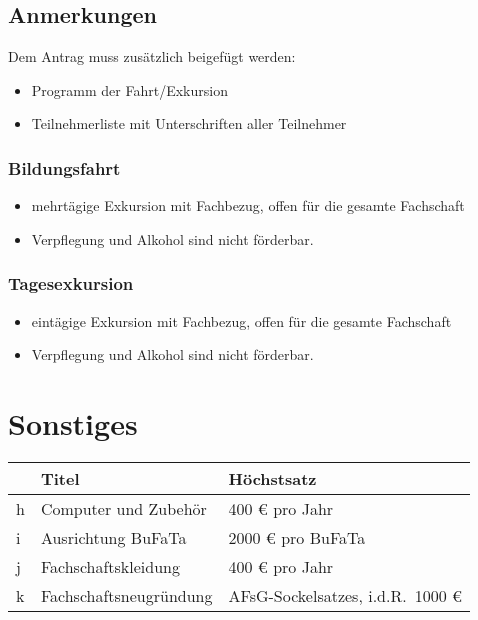 \documentclass{article}
\begin{document}
    \subsection{Anmerkungen}
    Dem Antrag muss zusätzlich beigefügt werden:
        \begin{itemize}
            \item Programm der Fahrt/Exkursion
            \item Teilnehmerliste mit Unterschriften aller Teilnehmer
        \end{itemize}
        \subsubsection{Bildungsfahrt}
            \begin{itemize}
                \item  mehrtägige Exkursion mit Fachbezug, offen für die gesamte Fachschaft
                \item Verpflegung und Alkohol sind nicht förderbar.
            \end{itemize}
        
        \subsubsection{Tagesexkursion}
            \begin{itemize}
                \item eintägige Exkursion mit Fachbezug, offen für die gesamte Fachschaft
                \item Verpflegung und Alkohol sind nicht förderbar.
            \end{itemize}
            

    
\section{Sonstiges}
    \setlength\extrarowheight{2mm} \sffamily
    \begin{tabular}{l||L{6cm}|L{7cm}}
        &\textbf{Titel} & \textbf{Höchstsatz}\\[1mm] \hline \hline
        h&
        Computer und Zubehör &
        400 € pro Jahr \\[1mm] \hline
         

         
        i&
        Ausrichtung BuFaTa  &
        2000 € pro BuFaTa \\[1mm] \hline
        
        j&
        Fachschaftskleidung&
        400 € pro Jahr \\[1mm] \hline
         
        k&
        Fachschaftsneugründung &
        AFsG-Sockelsatzes, i.d.R.\ 1000 € \\[1mm]
    \end{tabular}
    \rmfamily
\end{document}
